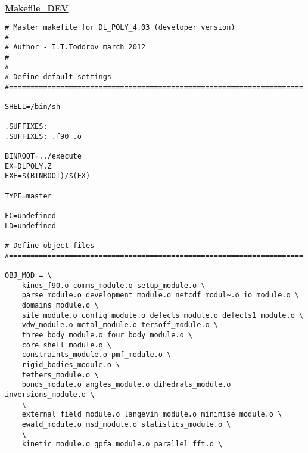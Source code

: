 \label{makefiles}
{\sc \bf \underline{Makefile\_DEV}}
\begin{verbatim}
# Master makefile for DL_POLY_4.03 (developer version)
#
# Author - I.T.Todorov march 2012
#
#
# Define default settings
#=====================================================================

SHELL=/bin/sh

.SUFFIXES:
.SUFFIXES: .f90 .o

BINROOT=../execute
EX=DLPOLY.Z
EXE=$(BINROOT)/$(EX)

TYPE=master

FC=undefined
LD=undefined

# Define object files
#=====================================================================

OBJ_MOD = \
	kinds_f90.o comms_module.o setup_module.o \
	parse_module.o development_module.o netcdf_modul~.o io_module.o \
	domains_module.o \
	site_module.o config_module.o defects_module.o defects1_module.o \
	vdw_module.o metal_module.o tersoff_module.o \
	three_body_module.o four_body_module.o \
	core_shell_module.o \
	constraints_module.o pmf_module.o \
	rigid_bodies_module.o \
	tethers_module.o \
	bonds_module.o angles_module.o dihedrals_module.o inversions_module.o \
	\
	external_field_module.o langevin_module.o minimise_module.o \
	ewald_module.o msd_module.o statistics_module.o \
	\
	kinetic_module.o gpfa_module.o parallel_fft.o \


\end{verbatim}
